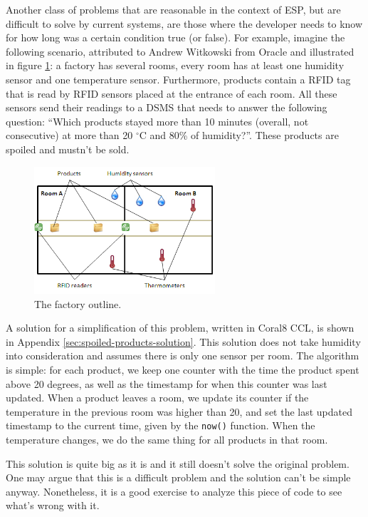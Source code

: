 \documentclass[a4,11pt]{report}
\begin{document}

Another class of problems that are reasonable in the context of ESP,
but are difficult to solve by current systems, are those where the
developer needs to know for how long was a certain condition true (or
false). For example, imagine the following scenario, attributed to
Andrew Witkowski from Oracle and illustrated in figure
\ref{fig:factory}: a factory has several rooms, every room has at
least one humidity sensor and one temperature sensor. Furthermore,
products contain a RFID tag that is read by RFID sensors placed at the
entrance of each room. All these sensors send their readings to a DSMS
that needs to answer the following question: ``Which products stayed
more than 10 minutes (overall, not consecutive) at more than 20
$^{\circ}$C and 80\% of humidity?''. These products are spoiled and
mustn't be sold.

\begin{figure}[htbp]
  \center
  \includegraphics[width=0.6\textwidth]{factory.png}
  \caption{The factory outline.}
  \label{fig:factory}
\end{figure}


A solution for a simplification of this problem, written in Coral8
CCL, is shown in Appendix \ref{sec:spoiled-products-solution}. This
solution does not take humidity into consideration and assumes there
is only one sensor per room. The algorithm is simple: for each
product, we keep one counter with the time the product spent above 20
degrees, as well as the timestamp for when this counter was last
updated. When a product leaves a room, we update its counter if the
temperature in the previous room was higher than 20, and set the last
updated timestamp to the current time, given by the \verb=now()=
function. When the temperature changes, we do the same thing for all
products in that room.

This solution is quite big as it is and it still doesn't solve the
original problem. One may argue that this is a difficult problem and
the solution can't be simple anyway. Nonetheless, it is a good
exercise to analyze this piece of code to see what's wrong with it.
\end{document}
